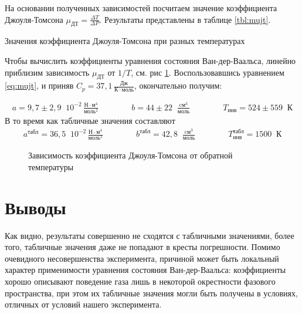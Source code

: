 \documentclass[a4paper,12pt]{article}
\newcommand\mujt{\mu_{\text{ДТ}}}
\begin{document}
  На основании полученных зависимостей посчитаем значение коэффициента Джоуля-Томсона $\mujt = \frac{\Delta T}{\Delta P}$. Результаты представлены в таблице \ref{tbl:mujt}.

  \begin{table}[!htb]
    \centering
    
    \caption{Значения коэффициента Джоуля-Томсона при разных температурах}
    \label{tbl:mujt}
  \end{table}

  Чтобы вычислить коэффициенты уравнения состояния Ван-дер-Ваальса, линейно приблизим зависимость $\mujt$ от $1/T$, см. рис \ref{fig:mujt}. Воспользовавшись уравнением \eqref{eq:mujt}, и приняв $C_p = 37,1\, \tfrac{\text{Дж}}{К \cdot \text{моль}}$, окончательно получим:

  \begin{align}
    a = 9,7 \pm 2,9 \;\; 10^{-2}\,\tfrac{Н \cdot м^4}{\text{моль}^2} \qquad \qquad
    b = 44 \pm 22 \;\; \tfrac{\text{cм}^3}{\text{моль}} \qquad \qquad
    T_{\text{инв}} = 524 \pm 559 \;\; К
  \end{align}
  В то время как табличные значения составляют
  \begin{align}
    a^{\text{табл}} = 36,5 \;\; 10^{-2}\,\tfrac{Н \cdot м^4}{\text{моль}^2} \qquad \qquad
    b^{\text{табл}} = 42,8 \;\; \tfrac{\text{cм}^3}{\text{моль}} \qquad \qquad
    T_{\text{инв}}^{\text{табл}} = 1500 \;\; К
  \end{align}

  \begin{figure}[!htb]
    \centering
    
    \caption{Зависимость коэффициента Джоуля-Томсона от обратной температуры}
    \label{fig:mujt}
  \end{figure}

\section{Выводы}
  Как видно, результаты совершенно не сходятся с табличными значениями, более того, табличные значения даже не попадают в кресты погрешности. Помимо очевидного несовершенства эксперимента, причиной может быть локальный характер применимости уравнения состояния Ван-дер-Ваальса: коэффициенты хорошо описывают поведение газа лишь в некоторой окрестности фазового пространства, при этом их табличные значения могли быть получены в условиях, отличных от условий нашего эксперимента.
\end{document}
